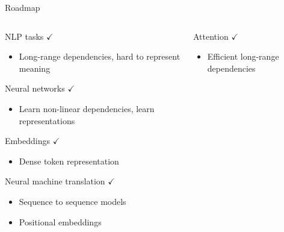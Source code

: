 \documentclass[12pt,aspectratio=169,handout]{beamer}
\begin{document}
\begin{frame}{Roadmap}
	
	\begin{columns}
		
		\begin{column}{0.5\linewidth}
			
			
			NLP tasks $\checkmark$
			
			\begin{itemize}
				\item {\scriptsize Long-range dependencies, hard to represent meaning}
			\end{itemize}
			
			Neural networks $\checkmark$
			
			\begin{itemize}
				\item {\scriptsize Learn non-linear dependencies, learn representations}
			\end{itemize}
			
			Embeddings $\checkmark$
			
			\begin{itemize}
				\item {\scriptsize Dense token representation}
			\end{itemize}
			
			Neural machine translation $\checkmark$
			
			\begin{itemize}
				\item {\scriptsize Sequence to sequence models}
				\item {\scriptsize Positional embeddings}
			\end{itemize}
			
		\end{column}
		
		\begin{column}{0.5\linewidth}
			
			Attention $\checkmark$
			
			\begin{itemize}
				\item {\scriptsize Efficient long-range dependencies}
			\end{itemize}
			
			
			
		\end{column}
		
	\end{columns}
	
\end{frame}
\end{document}

